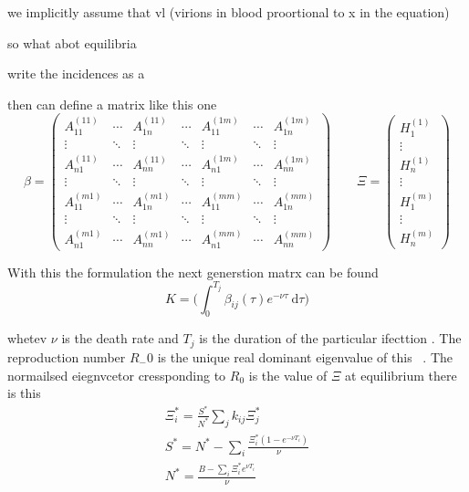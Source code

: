 \documentclass[DIV=15]{scrartcl}
\begin{document}
we implicitly assume that vl (virions in blood proortional to x in the equation)

so  what abot equilibria
 

write the incidences as a

then can define a matrix like this one
 \begin{equation}
\beta = \begin{pmatrix}
A_{11}^{(11)}& \cdots & A_{1n}^{(11)} & \cdots & A_{11}^{(1m)} & \cdots & A_{1n}^{(1m)} \\
\vdots & \ddots & \vdots & \ddots & \vdots & \ddots & \vdots \\ 
 A_{n1}^{(11)}& \cdots & A_{nn}^{(11)} & \cdots & A_{n1}^{(1m)} & \cdots & A_{nn}^{(1m)} \\
\vdots & \ddots & \vdots & \ddots & \vdots & \ddots & \vdots \\  
A_{11}^{(m1)}& \cdots & A_{1n}^{(m1)} & \cdots & A_{11}^{(mm)} & \cdots & A_{1n}^{(mm)} \\
\vdots & \ddots & \vdots & \ddots & \vdots & \ddots & \vdots \\ 
 A_{n1}^{(m1)}& \cdots & A_{nn}^{(m1)} & \cdots & A_{n1}^{(mm)} & \cdots & A_{nn}^{(mm)}
\end{pmatrix} \qquad
\Xi =\begin{pmatrix} H_{1}^{(1)}\\ \vdots \\ H_n^{(1)} \\ \vdots \\ H_1^{(m)}  \\ \vdots \\ H_n^{(m)} \end{pmatrix} 
\label{gamma}
\end{equation}


With this the formulation the next generstion  matrx  can be found 
  \begin{equation}
   K = \bigg( \int_0^{T_j}\beta_{ij}(\tau) e^{-\nu \tau} \ \text{d} \tau \bigg)
  \end{equation}

whetev 
$\nu$ is the death rate and $T_j$ is the duration of the particular ifecttion   .   The reproduction  number $R_-0$ is the unique real dominant eigenvalue of this~\cite{diekmann1990,diekmann2013} . The  normailsed eiegnvcetor  cressponding to  $R_0$ is the value of $ \Xi$ at equilibrium
  there is this 
 \begin{gather}
 \Xi_i^*  = \frac{S^*}{N^*} \sum_j k_{ij}\Xi_j^* \\
 S^* =  N^* - \sum_i \frac{\Xi _i^*(1-e^{-\nu T_i})}{\nu}\\
 N^* = \frac{B-\sum_i \Xi _i^* e^{\nu T_i}}{\nu}
 \end{gather}
 
\end{document}
